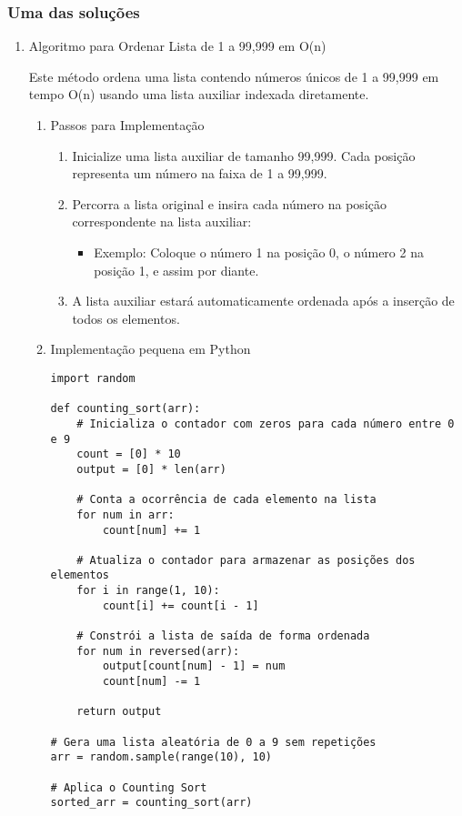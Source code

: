 \documentclass[11pt]{article}
\begin{document}
\subsubsection{Uma das soluções}
\label{sec:org3a0dc12}
\begin{enumerate}
\item Algoritmo para Ordenar Lista de 1 a 99,999 em O(n)
\label{sec:org5c1f8ce}

Este método ordena uma lista contendo números únicos de 1 a 99,999 em tempo O(n) usando uma lista auxiliar indexada diretamente.
\begin{enumerate}
\item Passos para Implementação
\label{sec:orgcba410b}
\begin{enumerate}
\item Inicialize uma lista auxiliar de tamanho 99,999. Cada posição representa um número na faixa de 1 a 99,999.
\item Percorra a lista original e insira cada número na posição correspondente na lista auxiliar:
\begin{itemize}
\item Exemplo: Coloque o número 1 na posição 0, o número 2 na posição 1, e assim por diante.
\end{itemize}
\item A lista auxiliar estará automaticamente ordenada após a inserção de todos os elementos.
\end{enumerate}
\item Implementação pequena em Python
\label{sec:org4739190}
\begin{verbatim}
import random

def counting_sort(arr):
    # Inicializa o contador com zeros para cada número entre 0 e 9
    count = [0] * 10
    output = [0] * len(arr)

    # Conta a ocorrência de cada elemento na lista
    for num in arr:
        count[num] += 1

    # Atualiza o contador para armazenar as posições dos elementos
    for i in range(1, 10):
        count[i] += count[i - 1]

    # Constrói a lista de saída de forma ordenada
    for num in reversed(arr):
        output[count[num] - 1] = num
        count[num] -= 1

    return output

# Gera uma lista aleatória de 0 a 9 sem repetições
arr = random.sample(range(10), 10)

# Aplica o Counting Sort
sorted_arr = counting_sort(arr)


\end{verbatim}
\end{enumerate}
\end{enumerate}
\end{document}
